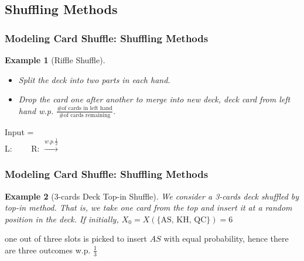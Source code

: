 \documentclass[red]{beamer}
\theoremstyle{mystyle}
\newtheorem*{ex}{Example}
\begin{document}
\subsection{Shuffling Methods}

\frame
{\frametitle{Modeling Card Shuffle: Shuffling Methods}
  \begin{ex}[Riffle Shuffle] 
  \begin{itemize}
    \item[1.] Split the deck into two parts in each hand.
    \item[2.] Drop the card one after another to merge into new deck, deck card from left hand w.p. $\frac{\text{\# of cards in left hand}}{\text{\# of cards remaining}}$.
  \end{itemize}
  \end{ex}
  \begin{center}
  Input = \\
  L: ~~~~R:  $\xrightarrow{w.p. \frac{1}{2}}$ \cardslot\\
  \end{center}
}


\frame
{\frametitle{Modeling Card Shuffle: Shuffling Methods}
  \begin{ex}[3-cards Deck Top-in Shuffle] We consider a 3-cards deck shuffled by top-in method. That is, we take one card from the top and insert it at a random position in the deck. If initially, $X_0=X(\{\text{AS, KH, QC}\})=6$
  \end{ex}

  \begin{center}
  \cardslot{}\cardslot{}\cardslot
  \end{center}
  one out of three slots is picked to insert $AS$ with equal probability, hence there are three outcomes w.p. $\frac{1}{3}$
  \begin{center}
    ~~~~~~~~
  \end{center}
}
\end{document}
